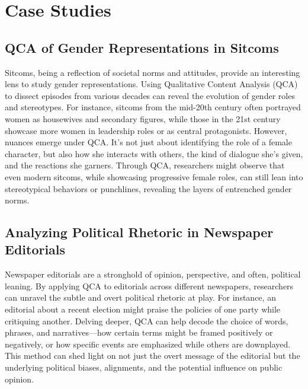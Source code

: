 \documentclass[
  b5paper]{book}
\begin{document}
\hypertarget{case-studies-2}{%
\section{Case Studies}\label{case-studies-2}}

\hypertarget{qca-of-gender-representations-in-sitcoms}{%
\subsection*{QCA of Gender Representations in Sitcoms}\label{qca-of-gender-representations-in-sitcoms}}

Sitcoms, being a reflection of societal norms and attitudes, provide an interesting lens to study gender representations. Using Qualitative Content Analysis (QCA) to dissect episodes from various decades can reveal the evolution of gender roles and stereotypes. For instance, sitcoms from the mid-20th century often portrayed women as housewives and secondary figures, while those in the 21st century showcase more women in leadership roles or as central protagonists. However, nuances emerge under QCA. It's not just about identifying the role of a female character, but also how she interacts with others, the kind of dialogue she's given, and the reactions she garners. Through QCA, researchers might observe that even modern sitcoms, while showcasing progressive female roles, can still lean into stereotypical behaviors or punchlines, revealing the layers of entrenched gender norms.

\hypertarget{analyzing-political-rhetoric-in-newspaper-editorials}{%
\subsection*{Analyzing Political Rhetoric in Newspaper Editorials}\label{analyzing-political-rhetoric-in-newspaper-editorials}}

Newspaper editorials are a stronghold of opinion, perspective, and often, political leaning. By applying QCA to editorials across different newspapers, researchers can unravel the subtle and overt political rhetoric at play. For instance, an editorial about a recent election might praise the policies of one party while critiquing another. Delving deeper, QCA can help decode the choice of words, phrases, and narratives---how certain terms might be framed positively or negatively, or how specific events are emphasized while others are downplayed. This method can shed light on not just the overt message of the editorial but the underlying political biases, alignments, and the potential influence on public opinion.
\end{document}
